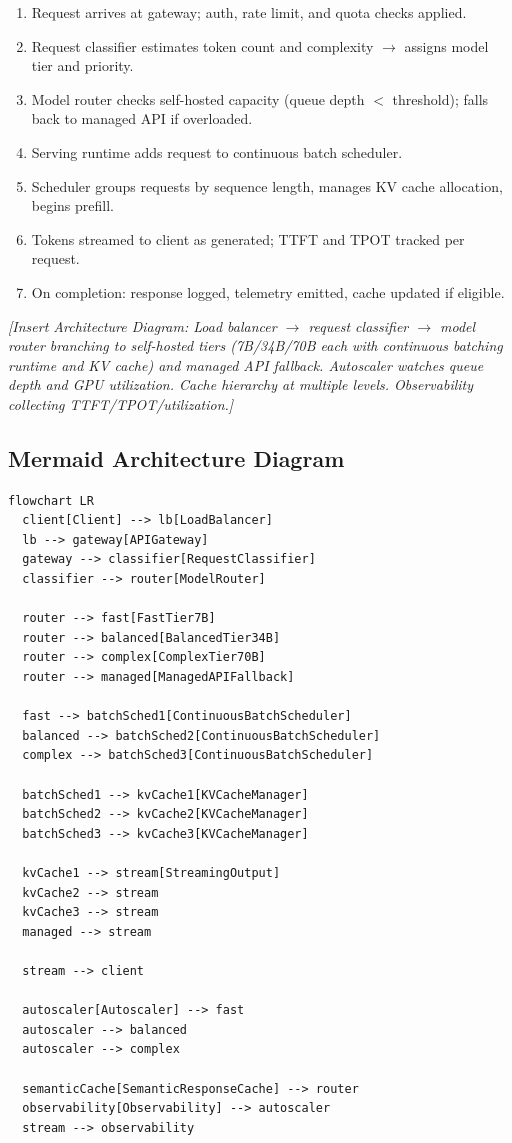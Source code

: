 \begin{enumerate}
  \item Request arrives at gateway; auth, rate limit, and quota checks applied.
  \item Request classifier estimates token count and complexity $\rightarrow$ assigns model tier and priority.
  \item Model router checks self-hosted capacity (queue depth $<$ threshold); falls back to managed API if overloaded.
  \item Serving runtime adds request to continuous batch scheduler.
  \item Scheduler groups requests by sequence length, manages KV cache allocation, begins prefill.
  \item Tokens streamed to client as generated; TTFT and TPOT tracked per request.
  \item On completion: response logged, telemetry emitted, cache updated if eligible.
\end{enumerate}

\textit{[Insert Architecture Diagram: Load balancer $\rightarrow$ request classifier $\rightarrow$ model router branching to self-hosted tiers (7B/34B/70B each with continuous batching runtime and KV cache) and managed API fallback. Autoscaler watches queue depth and GPU utilization. Cache hierarchy at multiple levels. Observability collecting TTFT/TPOT/utilization.]}

\subsection*{Mermaid Architecture Diagram}

\begin{verbatim}
flowchart LR
  client[Client] --> lb[LoadBalancer]
  lb --> gateway[APIGateway]
  gateway --> classifier[RequestClassifier]
  classifier --> router[ModelRouter]

  router --> fast[FastTier7B]
  router --> balanced[BalancedTier34B]
  router --> complex[ComplexTier70B]
  router --> managed[ManagedAPIFallback]

  fast --> batchSched1[ContinuousBatchScheduler]
  balanced --> batchSched2[ContinuousBatchScheduler]
  complex --> batchSched3[ContinuousBatchScheduler]

  batchSched1 --> kvCache1[KVCacheManager]
  batchSched2 --> kvCache2[KVCacheManager]
  batchSched3 --> kvCache3[KVCacheManager]

  kvCache1 --> stream[StreamingOutput]
  kvCache2 --> stream
  kvCache3 --> stream
  managed --> stream

  stream --> client

  autoscaler[Autoscaler] --> fast
  autoscaler --> balanced
  autoscaler --> complex

  semanticCache[SemanticResponseCache] --> router
  observability[Observability] --> autoscaler
  stream --> observability
\end{verbatim}

